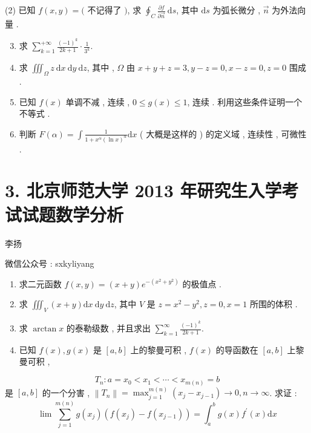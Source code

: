 \documentclass[10pt]{article}
\begin{document}
{(2)  已知  $f(x, y)=($  不记得了  $)$,  求  $\oint_{C} \frac{\partial f}{\partial \vec{n}} \mathrm{~d} s$,  其中  $\mathrm{d} s$  为弧长微分 , $\vec{n}$  为外法向量 .

\begin{enumerate}
  \setcounter{enumi}{2}
  \item  求  $\sum_{k=1}^{+\infty} \frac{(-1)^{k}}{2 k+1} \cdot \frac{1}{3^{k}}$.

  \item  求  $\iiint_{\Omega} z \mathrm{~d} x \mathrm{~d} y \mathrm{~d} z$,  其中 , $\Omega$  由  $x+y+z=3, y-z=0, x-z=0, z=0$  围成 .

  \item  已知  $f(x)$  单调不减 ,  连续 , $0 \leqslant g(x) \leqslant 1$,  连续 .  利用这些条件证明一个不等式 .

  \item  判断  $F(\alpha)=\int \frac{1}{1+x^{\alpha}(\ln x)^{\alpha}} \mathrm{d} x$ ( 大概是这样的 )  的定义域 ,  连续性 ,  可微性 .

\end{enumerate}
\section{3. 北京师范大学 2013 年研究生入学考试试题数学分析}
 李扬 

 微信公众号 : sxkyliyang

\begin{enumerate}
  \item  求二元函数  $f(x, y)=(x+y) e^{-\left(x^{2}+y^{2}\right)}$  的极值点 .

  \item  求  $\iiint_{V}(x+y) \mathrm{d} x \mathrm{~d} y \mathrm{~d} z$,  其中  $V$  是  $z=x^{2}-y^{2}, z=0, x=1$  所围的体积 .

  \item  求  $\arctan x$  的泰勒级数 ,  并且求出  $\sum_{k=1}^{\infty} \frac{(-1)^{k}}{2 k+1}$.

  \item  已知  $f(x), g(x)$  是  $[a, b]$  上的黎曼可积 , $f(x)$  的导函数在  $[a, b]$  上黎曼可积 ,

\end{enumerate}
$$
T_{n}: a=x_{0}<x_{1}<\cdots<x_{m(n)}=b
$$
 是  $[a, b]$  的一个分害 , $\left\|T_{n}\right\|=\max _{j=1}^{m(n)}\left(x_{j}-x_{j-1}\right) \rightarrow 0, n \rightarrow \infty$.  求证 :
$$
\lim \sum_{j=1}^{m(n)} g\left(x_{j}\right)\left(f\left(x_{j}\right)-f\left(x_{j-1}\right)\right)=\int_{a}^{b} g(x) f^{\prime}(x) \mathrm{d} x
$$

}
\end{document}

